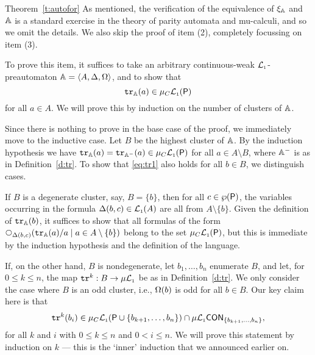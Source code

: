 \begin{proofof}{Theorem~\ref{t:autofor}}
As mentioned, the verification of the equivalence of $\xi_{\mathbb{A}}$ and $\mathbb{A}$
is a standard exercise in the theory of parity automata and mu-calculi, and so
we omit the details.
We also skip the proof of item (2), completely focussing on item (3).

To prove this item, it suffices to take an arbitrary continuous-weak 
$\mathcal{L}_{\scriptscriptstyle 1}$-preautomaton $\mathbb{A} = \langle{A,\Delta,\Omega}\rangle$, and to show that 
\begin{equation}
\label{eq:tr1}
\ytr_{\bbA}(a) \in \mu_{C}\llang(\props)
\end{equation}
for all $a \in A$.
We will prove this by induction on the number of clusters of $\mathbb{A}$.

Since there is nothing to prove in the base case of the proof, we immediately
move to the inductive case.
Let $B$ be the highest cluster of $\mathbb{A}$.
By the induction hypothesis we have $\mathtt{tr}_{\mathbb{A}}(a) = \mathtt{tr}_{\mathbb{A}^{-}}(a) \in 
\mu_{C}\mathcal{L}_{\scriptscriptstyle 1}(\mathsf{P})$ for all $a \in A \setminus B$, where 
$\mathbb{A}^{-}$ is as in Definition~\ref{d:tr}.
To show that \eqref{eq:tr1} also holds for all $b \in B$, we distinguish cases.

If $B$ is a degenerate cluster, say, $B = \{ b \}$, then for all $c \in 
\wp(\mathsf{P})$, the variables occurring in the formula $\Delta(b,c) \in \mathcal{L}_{\scriptscriptstyle 1}(A)$
are all from $A \setminus \{ b \}$.
Given the definition of $\mathtt{tr}_{\mathbb{A}}(b)$, it suffices to show that all formulas 
of the form $\nxt{\tmap(b,c)}(\ytr_{\bbA}(a)/a \mid a \in A \setminus \{ b \})$
belong to the set $\mu_{C}\mathcal{L}_{\scriptscriptstyle 1}(\mathsf{P})$, but this is immediate by the 
induction hypothesis and the definition of the language.

If, on the other hand, $B$ is nondegenerate, let $b_{1},\ldots,b_{n}$ enumerate
$B$, and let, for $0\leq k \leq n$, the map $\mathtt{tr}^{k}: B \to \mu\mathcal{L}_{\scriptscriptstyle 1}$ be as in
Definition~\ref{d:tr}.
We only consider the case where $B$ is an odd cluster, i.e., $\Omega(b)$ is odd
for all $b \in B$.
Our key claim here is that 
\begin{equation}
\label{eq:tr2}
\ytr^{k}(b_{i}) \in \mu_{C}\llang(\props \cup \{ b_{k+1},\ldots,b_{n}\}) \cap 
\cont{\mu\llang}{\{ b_{k+1},\ldots,b_{n}\}},
\end{equation}
for all $k$ and $i$ with $0 \leq k \leq n$ and $0 < i \leq n$.
We will prove this statement by induction on $k$ --- this is the `inner' 
induction that we announced earlier on.


\end{proofof}
